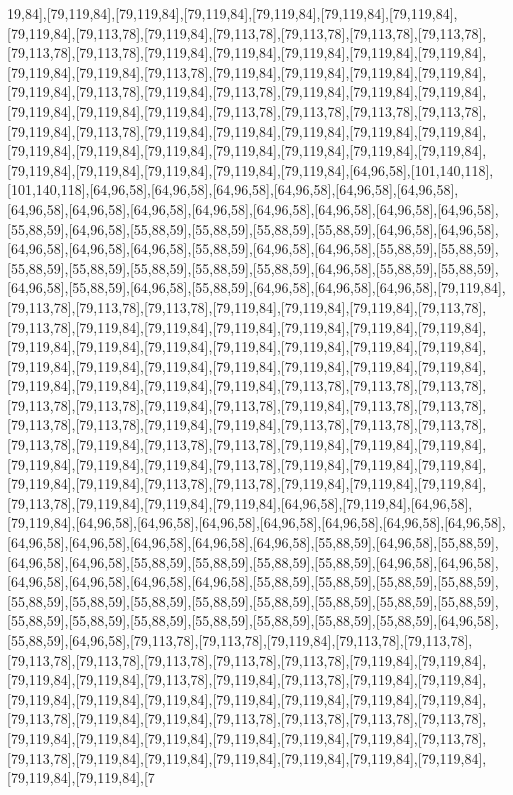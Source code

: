 19,84],[79,119,84],[79,119,84],[79,119,84],[79,119,84],[79,119,84],[79,119,84],[79,119,84],[79,113,78],[79,119,84],[79,113,78],[79,113,78],[79,113,78],[79,113,78],[79,113,78],[79,113,78],[79,119,84],[79,119,84],[79,119,84],[79,119,84],[79,119,84],[79,119,84],[79,119,84],[79,113,78],[79,119,84],[79,119,84],[79,119,84],[79,119,84],[79,119,84],[79,113,78],[79,119,84],[79,113,78],[79,119,84],[79,119,84],[79,119,84],[79,119,84],[79,119,84],[79,119,84],[79,113,78],[79,113,78],[79,113,78],[79,113,78],[79,119,84],[79,113,78],[79,119,84],[79,119,84],[79,119,84],[79,119,84],[79,119,84],[79,119,84],[79,119,84],[79,119,84],[79,119,84],[79,119,84],[79,119,84],[79,119,84],[79,119,84],[79,119,84],[79,119,84],[79,119,84],[79,119,84],[64,96,58],[101,140,118],[101,140,118],[64,96,58],[64,96,58],[64,96,58],[64,96,58],[64,96,58],[64,96,58],[64,96,58],[64,96,58],[64,96,58],[64,96,58],[64,96,58],[64,96,58],[64,96,58],[64,96,58],[55,88,59],[64,96,58],[55,88,59],[55,88,59],[55,88,59],[55,88,59],[64,96,58],[64,96,58],[64,96,58],[64,96,58],[64,96,58],[55,88,59],[64,96,58],[64,96,58],[55,88,59],[55,88,59],[55,88,59],[55,88,59],[55,88,59],[55,88,59],[55,88,59],[64,96,58],[55,88,59],[55,88,59],[64,96,58],[55,88,59],[64,96,58],[55,88,59],[64,96,58],[64,96,58],[64,96,58],[79,119,84],[79,113,78],[79,113,78],[79,113,78],[79,119,84],[79,119,84],[79,119,84],[79,113,78],[79,113,78],[79,119,84],[79,119,84],[79,119,84],[79,119,84],[79,119,84],[79,119,84],[79,119,84],[79,119,84],[79,119,84],[79,119,84],[79,119,84],[79,119,84],[79,119,84],[79,119,84],[79,119,84],[79,119,84],[79,119,84],[79,119,84],[79,119,84],[79,119,84],[79,119,84],[79,119,84],[79,119,84],[79,119,84],[79,113,78],[79,113,78],[79,113,78],[79,113,78],[79,113,78],[79,119,84],[79,113,78],[79,119,84],[79,113,78],[79,113,78],[79,113,78],[79,113,78],[79,119,84],[79,119,84],[79,113,78],[79,113,78],[79,113,78],[79,113,78],[79,119,84],[79,113,78],[79,113,78],[79,119,84],[79,119,84],[79,119,84],[79,119,84],[79,119,84],[79,119,84],[79,113,78],[79,119,84],[79,119,84],[79,119,84],[79,119,84],[79,119,84],[79,113,78],[79,113,78],[79,119,84],[79,119,84],[79,119,84],[79,113,78],[79,119,84],[79,119,84],[79,119,84],[64,96,58],[79,119,84],[64,96,58],[79,119,84],[64,96,58],[64,96,58],[64,96,58],[64,96,58],[64,96,58],[64,96,58],[64,96,58],[64,96,58],[64,96,58],[64,96,58],[64,96,58],[64,96,58],[55,88,59],[64,96,58],[55,88,59],[64,96,58],[64,96,58],[55,88,59],[55,88,59],[55,88,59],[55,88,59],[64,96,58],[64,96,58],[64,96,58],[64,96,58],[64,96,58],[64,96,58],[55,88,59],[55,88,59],[55,88,59],[55,88,59],[55,88,59],[55,88,59],[55,88,59],[55,88,59],[55,88,59],[55,88,59],[55,88,59],[55,88,59],[55,88,59],[55,88,59],[55,88,59],[55,88,59],[55,88,59],[55,88,59],[55,88,59],[64,96,58],[55,88,59],[64,96,58],[79,113,78],[79,113,78],[79,119,84],[79,113,78],[79,113,78],[79,113,78],[79,113,78],[79,113,78],[79,113,78],[79,113,78],[79,119,84],[79,119,84],[79,119,84],[79,119,84],[79,113,78],[79,119,84],[79,113,78],[79,119,84],[79,119,84],[79,119,84],[79,119,84],[79,119,84],[79,119,84],[79,119,84],[79,119,84],[79,119,84],[79,113,78],[79,119,84],[79,119,84],[79,113,78],[79,113,78],[79,113,78],[79,113,78],[79,119,84],[79,119,84],[79,119,84],[79,119,84],[79,119,84],[79,119,84],[79,113,78],[79,113,78],[79,119,84],[79,119,84],[79,119,84],[79,119,84],[79,119,84],[79,119,84],[79,119,84],[79,119,84],[7